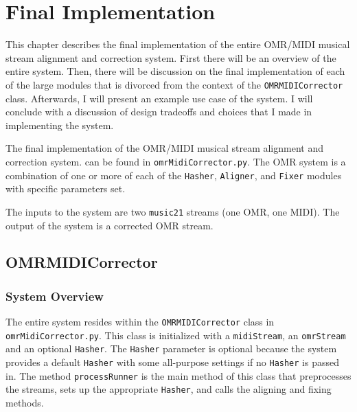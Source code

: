 \chapter{Final Implementation}
This chapter describes the final implementation of the entire OMR/MIDI musical stream alignment and correction system. First there will be an overview of the entire system. Then, there will be discussion on the final implementation of each of the large modules that is divorced from the context of the \texttt{OMRMIDICorrector} class. Afterwards, I will present an example use case of the system. I will conclude with a discussion of design tradeoffs and choices that I made in implementing the system.

The final implementation of the OMR/MIDI musical stream alignment and correction system. can be found in \texttt{omrMidiCorrector.py}. The OMR system is a combination of one or more of each of the \texttt{Hasher}, \texttt{Aligner}, and \texttt{Fixer} modules with specific parameters set. 

The inputs to the system are two \texttt{music21} streams (one OMR, one MIDI). The output of the system is a corrected OMR stream. 

\section{OMRMIDICorrector}

\subsection{System Overview}
The entire system resides within the \texttt{OMRMIDICorrector} class in \texttt{omrMidiCorrector.py}. This class is initialized with a \texttt{midiStream}, an \texttt{omrStream} and an optional \texttt{Hasher}. The \texttt{Hasher} parameter is optional because the system provides a default \texttt{Hasher} with some all-purpose settings if no \texttt{Hasher} is passed in. The method \texttt{processRunner} is the main method of this class that preprocesses the streams, sets up the appropriate \texttt{Hasher}, and calls the aligning and fixing methods.

